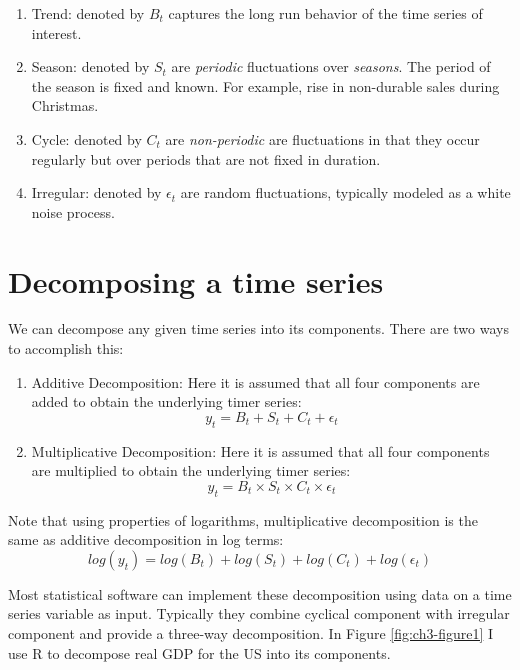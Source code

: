 \documentclass[]{book}
\theoremstyle{definition}
\theoremstyle{definition}
\theoremstyle{definition}
\theoremstyle{remark}
\begin{document}
\begin{enumerate}
\def\labelenumi{\arabic{enumi}.}
\item
  Trend: denoted by \(B_t\) captures the long run behavior of the time
  series of interest.
\item
  Season: denoted by \(S_t\) are \emph{periodic} fluctuations over
  \emph{seasons}. The period of the season is fixed and known. For
  example, rise in non-durable sales during Christmas.
\item
  Cycle: denoted by \(C_t\) are \emph{non-periodic} are fluctuations in
  that they occur regularly but over periods that are not fixed in
  duration.
\item
  Irregular: denoted by \(\epsilon_t\) are random fluctuations,
  typically modeled as a white noise process.
\end{enumerate}

\hypertarget{decomposing-a-time-series}{%
\section{Decomposing a time series}\label{decomposing-a-time-series}}

We can decompose any given time series into its components. There are
two ways to accomplish this:

\begin{enumerate}
\def\labelenumi{\arabic{enumi}.}
\item
  Additive Decomposition: Here it is assumed that all four components
  are added to obtain the underlying timer series: \begin{equation}
  y_t= B_t+S_t+C_t +\epsilon_t
  \end{equation}
\item
  Multiplicative Decomposition: Here it is assumed that all four
  components are multiplied to obtain the underlying timer series:
  \begin{equation}
  y_t= B_t \times S_t \times C_t \times \epsilon_t
  \end{equation}
\end{enumerate}

Note that using properties of logarithms, multiplicative decomposition
is the same as additive decomposition in log terms: \begin{equation}
log(y_t)= log(B_t) + log(S_t) + log(C_t) + log(\epsilon_t)
\end{equation}

Most statistical software can implement these decomposition using data
on a time series variable as input. Typically they combine cyclical
component with irregular component and provide a three-way
decomposition. In Figure \ref{fig:ch3-figure1} I use R to decompose real
GDP for the US into its components.
\end{document}
